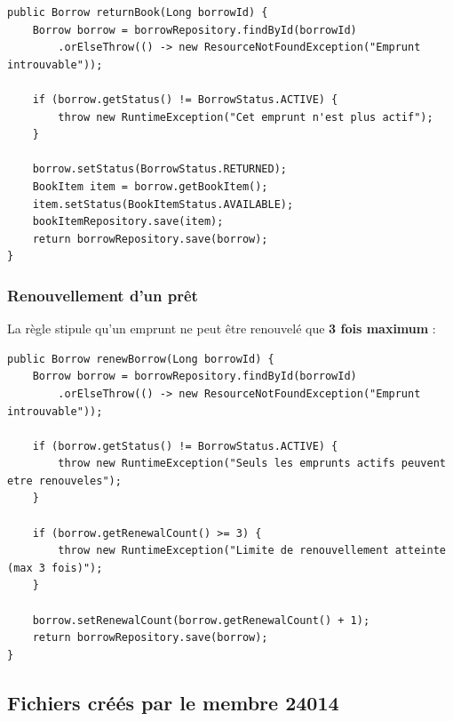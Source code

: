 \documentclass[12pt,a4paper,twoside]{report}
\begin{document}
\begin{lstlisting}[caption=Méthode returnBook (extrait)]
public Borrow returnBook(Long borrowId) {
    Borrow borrow = borrowRepository.findById(borrowId)
        .orElseThrow(() -> new ResourceNotFoundException("Emprunt introuvable"));

    if (borrow.getStatus() != BorrowStatus.ACTIVE) {
        throw new RuntimeException("Cet emprunt n'est plus actif");
    }

    borrow.setStatus(BorrowStatus.RETURNED);
    BookItem item = borrow.getBookItem();
    item.setStatus(BookItemStatus.AVAILABLE);
    bookItemRepository.save(item);
    return borrowRepository.save(borrow);
}
\end{lstlisting}

\subsubsection{Renouvellement d'un prêt}

La règle stipule qu'un emprunt ne peut être renouvelé que \textbf{3 fois maximum} :

\begin{lstlisting}[caption=Méthode renewBorrow (extrait)]
public Borrow renewBorrow(Long borrowId) {
    Borrow borrow = borrowRepository.findById(borrowId)
        .orElseThrow(() -> new ResourceNotFoundException("Emprunt introuvable"));

    if (borrow.getStatus() != BorrowStatus.ACTIVE) {
        throw new RuntimeException("Seuls les emprunts actifs peuvent etre renouveles");
    }

    if (borrow.getRenewalCount() >= 3) {
        throw new RuntimeException("Limite de renouvellement atteinte (max 3 fois)");
    }

    borrow.setRenewalCount(borrow.getRenewalCount() + 1);
    return borrowRepository.save(borrow);
}
\end{lstlisting}

\subsection{Fichiers créés par le membre 24014}
\end{document}
